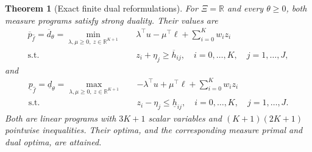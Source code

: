 \documentclass[review,11pt,3p,authoryear,nopreprintline]{elsarticle}
\newtheorem{theorem}{Theorem}
\begin{document}
\begin{theorem}[Exact finite dual reformulations]
  \label{thm-finite-dual-reformulations}
  For $\Xi=\mathbb R$ and every $\theta\ge0$, both measure programs satisfy strong duality. Their values are
  \begin{equation}
    \begin{aligned}
      \overline p_{\hat f}=\overline d_\theta
      =\min_{\lambda,\mu\ge0,\ z\in\mathbb R^{K+1}}\quad&
      \lambda^\top u-\mu^\top\ell+\sum_{i=0}^K w_i z_i\\
      \text{s.t.}\quad&z_i+\eta_j\ge\overline h_{ij},
      \quad i=0,\ldots,K,\quad j=1,\ldots,J,
    \end{aligned}
    \label{eq-finite-upper-dual}
  \end{equation}
  and
  \begin{equation}
    \begin{aligned}
      \underline p_{\hat f}=\underline d_\theta
      =\max_{\lambda,\mu\ge0,\ z\in\mathbb R^{K+1}}\quad&
      -\lambda^\top u+\mu^\top\ell+\sum_{i=0}^K w_i z_i\\
      \text{s.t.}\quad&z_i-\eta_j\le\underline h_{ij},
      \quad i=0,\ldots,K,\quad j=1,\ldots,J.
    \end{aligned}
    \label{eq-finite-lower-dual}
  \end{equation}
  Both are linear programs with $3K+1$ scalar variables and $(K+1)(2K+1)$ pointwise inequalities. Their optima, and the corresponding measure primal and dual optima, are attained.
\end{theorem}
\end{document}
